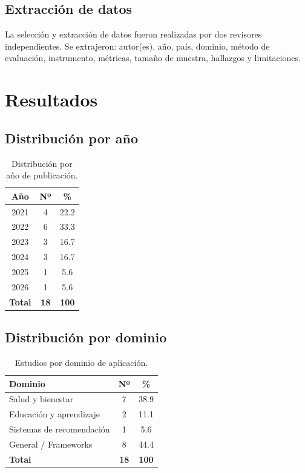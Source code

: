 \documentclass[11pt,twocolumn]{article}
\begin{document}
\subsection{Extracción de datos}

La selección y extracción de datos fueron realizadas por dos revisores independientes. Se extrajeron: autor(es), año, país, dominio, método de evaluación, instrumento, métricas, tamaño de muestra, hallazgos y limitaciones.

\section{Resultados}

\subsection{Distribución por año}

\begin{table}[H]
\centering
\caption{Distribución por año de publicación.}
\label{tab:anios}
\begin{tabular}{@{}ccc@{}}
\toprule
\textbf{Año} & \textbf{Nº} & \textbf{\%} \\
\midrule
2021 & 4 & 22.2 \\
2022 & 6 & 33.3 \\
2023 & 3 & 16.7 \\
2024 & 3 & 16.7 \\
2025 & 1 & 5.6 \\
2026 & 1 & 5.6 \\
\midrule
\textbf{Total} & \textbf{18} & \textbf{100} \\
\bottomrule
\end{tabular}
\end{table}

\subsection{Distribución por dominio}

\begin{table}[H]
\centering
\caption{Estudios por dominio de aplicación.}
\label{tab:dominios}
\begin{tabular}{@{}lcc@{}}
\toprule
\textbf{Dominio} & \textbf{Nº} & \textbf{\%} \\
\midrule
Salud y bienestar & 7 & 38.9 \\
Educación y aprendizaje & 2 & 11.1 \\
Sistemas de recomendación & 1 & 5.6 \\
General / Frameworks & 8 & 44.4 \\
\midrule
\textbf{Total} & \textbf{18} & \textbf{100} \\
\bottomrule
\end{tabular}
\end{table}
\end{document}
